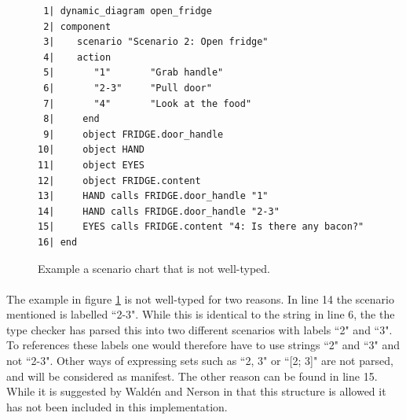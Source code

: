 \begin{figure}[H]
{\footnotesize
\begin{verbatim}
 1| dynamic_diagram open_fridge
 2| component
 3|    scenario "Scenario 2: Open fridge"
 4|    action
 5|       "1"       "Grab handle"
 6|       "2-3"     "Pull door"
 7|       "4"       "Look at the food"
 8|     end
 9|     object FRIDGE.door_handle 
10|     object HAND
11|     object EYES
12|     object FRIDGE.content
13|     HAND calls FRIDGE.door_handle "1"
14|     HAND calls FRIDGE.door_handle "2-3"
15|     EYES calls FRIDGE.content "4: Is there any bacon?"
16| end
\end{verbatim}
}
\caption{Example a scenario chart that is not well-typed.}
\label{fig:not_well_typed}
\end{figure}

\paragraph{}
The example in figure \ref{fig:not_well_typed} is not well-typed for two reasons. In line 14 the scenario mentioned is labelled ``2-3". While this is identical to the string in line 6, the the type checker has parsed this into two different scenarios with labels ``2" and ``3". To references these labels one would therefore have to use strings ``2" and ``3" and not ``2-3". Other ways of expressing sets such as ``2, 3" or ``[2; 3]" are not parsed, and will be considered as manifest. The other reason can be found in line 15. While it is suggested by Wald\'{e}n and Nerson in \cite{walden1995} that this structure is allowed it has not been included in this implementation.